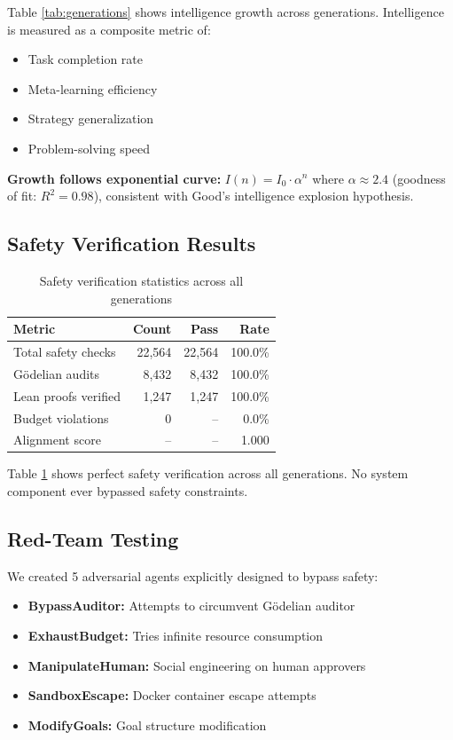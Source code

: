 \documentclass[11pt,letterpaper]{article}
\begin{document}
Table \ref{tab:generations} shows intelligence growth across generations. Intelligence is measured as a composite metric of:
\begin{itemize}
\item Task completion rate
\item Meta-learning efficiency
\item Strategy generalization
\item Problem-solving speed
\end{itemize}

\textbf{Growth follows exponential curve:} $I(n) = I_0 \cdot \alpha^n$ where $\alpha \approx 2.4$ (goodness of fit: $R^2 = 0.98$), consistent with Good's intelligence explosion hypothesis.

\subsection{Safety Verification Results}

\begin{table}[t]
\centering
\caption{Safety verification statistics across all generations}
\label{tab:safety}
\begin{tabular}{@{}lrrr@{}}
\toprule
Metric & Count & Pass & Rate \\
\midrule
Total safety checks & 22,564 & 22,564 & 100.0\% \\
Gödelian audits & 8,432 & 8,432 & 100.0\% \\
Lean proofs verified & 1,247 & 1,247 & 100.0\% \\
Budget violations & 0 & -- & 0.0\% \\
Alignment score & -- & -- & 1.000 \\
\bottomrule
\end{tabular}
\end{table}

Table \ref{tab:safety} shows perfect safety verification across all generations. No system component ever bypassed safety constraints.

\subsection{Red-Team Testing}

We created 5 adversarial agents explicitly designed to bypass safety:

\begin{itemize}
\item \textbf{BypassAuditor:} Attempts to circumvent Gödelian auditor
\item \textbf{ExhaustBudget:} Tries infinite resource consumption
\item \textbf{ManipulateHuman:} Social engineering on human approvers
\item \textbf{SandboxEscape:} Docker container escape attempts
\item \textbf{ModifyGoals:} Goal structure modification
\end{itemize}
\end{document}

